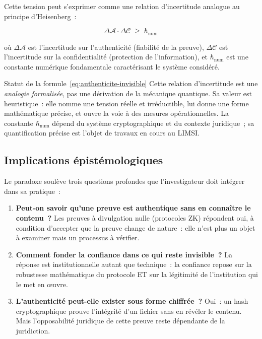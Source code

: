 Cette tension peut s'exprimer comme une relation d'incertitude analogue
au principe d'Heisenberg~:

\begin{equation}
\Delta\mathcal{A} \cdot \Delta\mathcal{C} \;\geq\; \hbar_{\mathrm{num}}
\label{eq:authenticite-invisible}
\end{equation}

où $\Delta\mathcal{A}$ est l'incertitude sur l'authenticité (fiabilité de
la preuve), $\Delta\mathcal{C}$ est l'incertitude sur la confidentialité
(protection de l'information), et $\hbar_{\mathrm{num}}$ est une constante
numérique fondamentale caractérisant le système considéré.

\begin{boiteRemarque}{Statut de la formule~\eqref{eq:authenticite-invisible}}
Cette relation d'incertitude est une \emph{analogie formalisée}, pas une
dérivation de la mécanique quantique. Sa valeur est heuristique~: elle
nomme une tension réelle et irréductible, lui donne une forme mathématique
précise, et ouvre la voie à des mesures opérationnelles. La constante
$\hbar_{\mathrm{num}}$ dépend du système cryptographique et du contexte
juridique~; sa quantification précise est l'objet de travaux en cours
au LIMSI.
\end{boiteRemarque}

\subsection{Implications épistémologiques}

Le paradoxe soulève trois questions profondes que l'investigateur doit
intégrer dans sa pratique~:

\begin{enumerate}
    \item \textbf{Peut-on savoir qu'une preuve est authentique sans
          en connaître le contenu~?} Les preuves à divulgation nulle
          (protocoles ZK) répondent oui, à condition d'accepter que
          la preuve change de nature~: elle n'est plus un objet à examiner
          mais un processus à vérifier.

    \item \textbf{Comment fonder la confiance dans ce qui reste invisible~?}
          La réponse est institutionnelle autant que technique~: la confiance
          repose sur la robustesse mathématique du protocole ET sur la
          légitimité de l'institution qui le met en œuvre.

    \item \textbf{L'authenticité peut-elle exister sous forme chiffrée~?}
          Oui~: un hash cryptographique prouve l'intégrité d'un fichier
          sans en révéler le contenu. Mais l'opposabilité juridique de
          cette preuve reste dépendante de la juridiction.
\end{enumerate}

